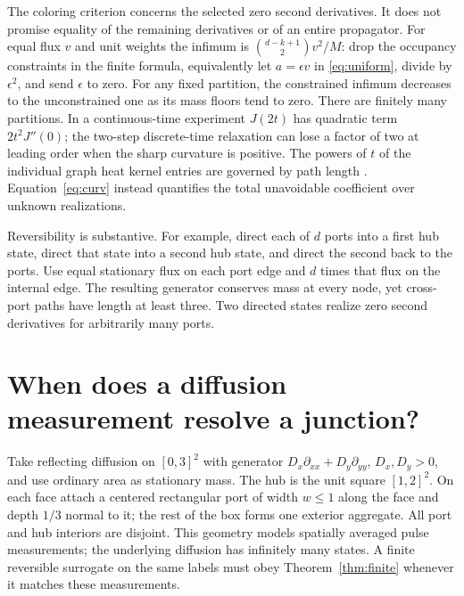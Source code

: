 \documentclass[11pt]{article}
\begin{document}
The coloring criterion concerns the selected zero second derivatives. It does not promise equality of the remaining derivatives or of an entire propagator. For equal flux \(v\) and unit weights the infimum is \(\binom{d-k+1}{2}v^2/M\): drop the occupancy constraints in the finite formula, equivalently let \(a=\epsilon v\) in \eqref{eq:uniform}, divide by \(\epsilon^2\), and send \(\epsilon\) to zero. For any fixed partition, the constrained infimum decreases to the unconstrained one as its mass floors tend to zero. There are finitely many partitions. In a continuous-time experiment \(J(2t)\) has quadratic term \(2t^2 J''(0)\); the two-step discrete-time relaxation can lose a factor of two at leading order when the sharp curvature is positive. The powers of \(t\) of the individual graph heat kernel entries are governed by path length \cite{keller}. Equation~\eqref{eq:curv} instead quantifies the total unavoidable coefficient over unknown realizations.

Reversibility is substantive. For example, direct each of \(d\) ports into a first hub state, direct that state into a second hub state, and direct the second back to the ports. Use equal stationary flux on each port edge and \(d\) times that flux on the internal edge. The resulting generator conserves mass at every node, yet cross-port paths have length at least three. Two directed states realize zero second derivatives for arbitrarily many ports.

\section{When does a diffusion measurement resolve a junction?}
Take reflecting diffusion on \([0,3]^2\) with generator \(D_x\partial_{xx}+D_y\partial_{yy}\), \(D_x,D_y>0\), and use ordinary area as stationary mass. The hub is the unit square \([1,2]^2\). On each face attach a centered rectangular port of width \(w\le1\) along the face and depth \(1/3\) normal to it; the rest of the box forms one exterior aggregate. All port and hub interiors are disjoint. This geometry models spatially averaged pulse measurements; the underlying diffusion has infinitely many states. A finite reversible surrogate on the same labels must obey Theorem~\ref{thm:finite} whenever it matches these measurements.
\end{document}
